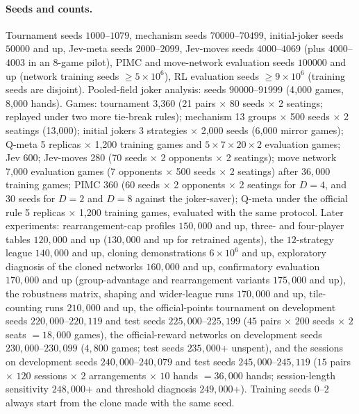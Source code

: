 \documentclass[11pt]{article}
\begin{document}
\paragraph{Seeds and counts.} Tournament seeds $1000$--$1079$, mechanism seeds $70000$--$70499$, initial-joker seeds $50000$ and up, Jev-meta seeds $2000$--$2099$, Jev-moves seeds $4000$--$4069$ (plus $4000$--$4003$ in an 8-game pilot), PIMC and move-network evaluation seeds $100000$ and up (network training seeds $\ge 5{\times}10^6$), RL evaluation seeds $\ge 9{\times}10^6$ (training seeds are disjoint). Pooled-field joker analysis: seeds $90000$--$91999$ (4{,}000 games, 8{,}000 hands). Games: tournament 3{,}360 (21 pairs $\times$ 80 seeds $\times$ 2 seatings; replayed under two more tie-break rules); mechanism 13 groups $\times$ 500 seeds $\times$ 2 seatings (13{,}000); initial jokers 3 strategies $\times$ 2{,}000 seeds (6{,}000 mirror games); Q-meta 5 replicas $\times$ 1{,}200 training games and $5\times 7\times 20\times 2$ evaluation games; Jev 600; Jev-moves 280 (70 seeds $\times$ 2 opponents $\times$ 2 seatings); move network 7{,}000 evaluation games (7 opponents $\times$ 500 seeds $\times$ 2 seatings) after $36{,}000$ training games; PIMC 360 (60 seeds $\times$ 2 opponents $\times$ 2 seatings for $D=4$, and 30 seeds for $D=2$ and $D=8$ against the joker-saver); Q-meta under the official rule 5 replicas $\times$ 1{,}200 training games, evaluated with the same protocol. Later experiments: rearrangement-cap profiles $150{,}000$ and up, three- and four-player tables $120{,}000$ and up ($130{,}000$ and up for retrained agents), the $12$-strategy league $140{,}000$ and up, cloning demonstrations $6\times10^6$ and up, exploratory diagnosis of the cloned networks $160{,}000$ and up, confirmatory evaluation $170{,}000$ and up (group-advantage and rearrangement variants $175{,}000$ and up), the robustness matrix, shaping and wider-league runs $170{,}000$ and up, tile-counting runs $210{,}000$ and up, the official-points tournament on development seeds $220{,}000$--$220{,}119$ and test seeds $225{,}000$--$225{,}199$ ($45$ pairs $\times$ $200$ seeds $\times$ $2$ seats $=18{,}000$ games), the official-reward networks on development seeds $230{,}000$--$230{,}099$ ($4{,}800$ games; test seeds $235{,}000$+ unspent), and the sessions on development seeds $240{,}000$--$240{,}079$ and test seeds $245{,}000$--$245{,}119$ ($15$ pairs $\times$ $120$ sessions $\times$ $2$ arrangements $\times$ $10$ hands $=36{,}000$ hands; session-length sensitivity $248{,}000$+ and threshold diagnosis $249{,}000$+). Training seeds $0$--$2$ always start from the clone made with the same seed.
\end{document}
